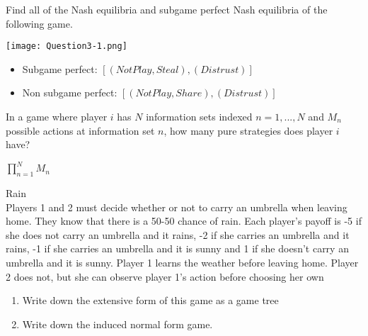 \documentclass[../main.tex]{subfiles}
\begin{document}
\begin{question}
    Find all of the Nash equilibria and subgame perfect Nash equilibria of the following game.

    \centering
    \texttt{[image: Question3-1.png]}
\end{question}

\begin{solution} 
\begin{itemize}
	\item Subgame perfect: $[(Not Play, Steal),(Distrust)]$
	\item Non subgame perfect: $[(Not Play, Share),(Distrust)]$
\end{itemize}
\end{solution}

\begin{question}
In a game where player $i$ has $N$ information sets indexed $n = 1, ..., N$ and $M_n$ possible actions at information set $n$, how many pure strategies does player $i$ have?
\end{question}

\begin{solution}
$\prod\limits_{n=1}^N M_n$
\end{solution}

\begin{question}
Rain\\
Players 1 and 2 must decide whether or not to carry an umbrella when leaving home. They know that there is a 50-50 chance of rain. Each player's payoff is -5 if she does not carry an umbrella and it rains, -2 if she carries an umbrella and it rains, -1 if she carries an umbrella and it is sunny and 1 if she doesn't carry an umbrella and it is sunny. Player 1 learns the weather before leaving home. Player 2 does not, but she can observe player 1's action before choosing her own
\begin{enumerate}
\item Write down the extensive form of this game as a game tree
\item Write down the induced normal form game.
\end{enumerate}
\end{question}
\end{document}
